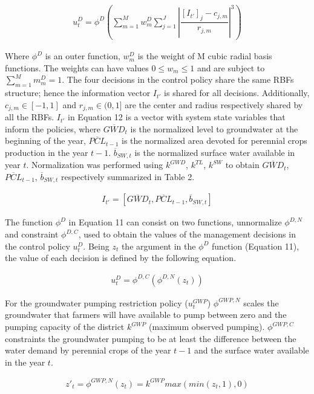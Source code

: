\documentclass[11pt,a4paper]{article}
\begin{document}
\begin{align}
u_{t}^D = \phi^{D}\left(\sum_{m=1}^M w_{m}^D \sum_{j=1}^J \left\lvert\dfrac{[I_{t'}]_{j}-c_{j,m}}{r_{j,m}}\right\rvert^{3}\right)
\end{align}

Where $\phi^{D}$ is an outer function, $w_{m}^D$ is the weight of M cubic radial basis functions. The weights can have values $ 0 \leq w_{m} \leq 1$ and are subject to $\sum_{m=1}^M m_{m}^D= 1$. The four decisions in the control policy share the same RBFs structure; hence the information vector $I_{t'}$ is shared for all decisions. Additionally, $c_{j,m} \in [-1,1]$ and $r_{j,m} \in (0,1]$ are the center and radius respectively shared by all the RBFs. $I_{t'}$ in Equation 12 is a vector with system state variables that inform the policies, where $\overline{GWD}_{t}$ is the normalized level to groundwater at the beginning of the year, $\overline{PCL}_{t-1}$ is the normalized area devoted for perennial crops production in the year $t-1$. $\overline{b}_{SW,t}$ is the normalized surface water available in year $t$. Normalization was performed using $k^{GWD}$, $k^{TL}$, $k^{SW}$ to obtain $\overline{GWD}_{t}$, $\overline{PCL}_{t-1}$, $\overline{b}_{SW,t}$ respectively summarized in Table 2.

\begin{align}
I_{t'} = [\overline{GWD}_{t},\overline{PCL}_{t-1},\overline{b}_{SW,t}]
\end{align}

The function $\phi^{D}$ in Equation 11 can consist on two functions, unnormalize $\phi^{D,N}$ and constraint $\phi^{D,C}$, used to obtain the values of the management decisions in the control policy $u_{t}^D$. Being $z_{t}$ the argument in the $\phi^{D}$ function (Equation 11), the value of each decision is defined by the following equation.

\begin{align}
u^{D}_t = \phi^{D,C}(\phi^{D,N}(z_{t}))
\end{align}

For the groundwater pumping restriction policy ($u^{GWP}_t$) $\phi^{GWP,N}$ scales the groundwater that farmers will have available to pump between zero and the pumping capacity of the district $k^{GWP}$ (maximum observed pumping). $\phi^{GWP,C}$ constraints the groundwater pumping to be at least the difference between the water demand by perennial crops of the year $t-1$ and the surface water available in the year $t$. 

\begin{align}
z'_{t}=\phi^{GWP,N}(z_{t}) = k^{GWP}max(min(z_{t},1),0) 
\end{align}
\end{document}
